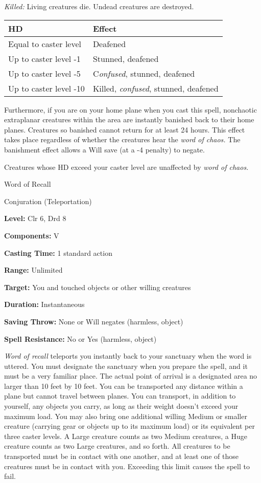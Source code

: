 \documentclass{article}
\begin{document}
\textit{Killed: }Living creatures die. Undead creatures are destroyed.

\begin{tabular}{|>{\raggedright}p{86pt}|>{\raggedright}p{141pt}|}
\hline
H\textbf{D} & E\textbf{ffect}\tabularnewline
\hline
Equal to caster level & Deafened\tabularnewline
\hline
Up to caster level -1 & Stunned, deafened\tabularnewline
\hline
Up to caster level -5 & C\textit{onfused}, stunned, deafened\tabularnewline
\hline
Up to caster level -10 & Killed, \textit{confused}, stunned, deafened\tabularnewline
\hline
\end{tabular}

Furthermore, if you are on your home plane when you cast this spell, nonchaotic 
extraplanar creatures within the area are instantly banished back to their home 
planes. Creatures so banished cannot return for at least 24 hours. This effect 
takes place regardless of whether the creatures hear the \textit{word of chaos. 
}The banishment effect allows a Will save (at a -4 penalty) to negate.

Creatures whose HD exceed your caster level are unaffected by \textit{word of chaos.}

\vspace{12pt}
Word of Recall

Conjuration (Teleportation)

\textbf{Level:} Clr 6, Drd 8

\textbf{Components:} V

\textbf{Casting Time:} 1 standard action

\textbf{Range:} Unlimited

\textbf{Target:} You and touched objects or other willing creatures

\textbf{Duration:} Instantaneous

\textbf{Saving Throw:} None or Will negates (harmless, object)

\textbf{Spell Resistance:} No or Yes (harmless, object)

\textit{Word of recall }teleports you instantly back to your sanctuary when the 
word is uttered. You must designate the sanctuary when you prepare the spell, and 
it must be a very familiar place. The actual point of arrival is a designated area 
no larger than 10 feet by 10 feet. You can be transported any distance within a 
plane but cannot travel between planes. You can transport, in addition to yourself, 
any objects you carry, as long as their weight doesn't exceed your maximum load. 
You may also bring one additional willing Medium or smaller creature (carrying 
gear or objects up to its maximum load) or its equivalent per three caster levels. 
A Large creature counts as two Medium creatures, a Huge creature counts as two 
Large creatures, and so forth. All creatures to be transported must be in contact 
with one another, and at least one of those creatures must be in contact with you. 
Exceeding this limit causes the spell to fail.
\end{document}
